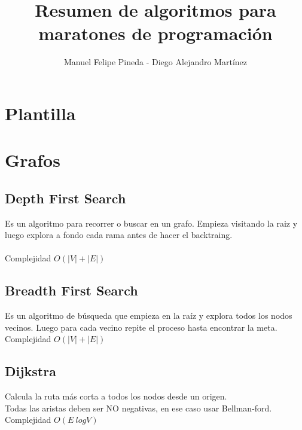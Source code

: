 \documentclass[10pt,letterpaper,twocolumn,twosided]{article}
\newcommand{\codigofuente}[1]{

\dotfill
}
\begin{document}
\title{Resumen de algoritmos para maratones de programación}
\author{Manuel Felipe Pineda - Diego Alejandro Martínez}
\maketitle

\tableofcontents
{}

\newpage

\section{Plantilla}
\codigofuente{../src/template.${EXT}}

\section{Grafos}

\subsection{Depth First Search}

Es un algoritmo para recorrer o buscar en un grafo. Empieza visitando la raiz y luego explora 
a fondo cada rama antes de hacer el backtraing.\\
\\
Complejidad $O(|V|+|E|)$

\codigofuente{../src/dfs.${EXT}}

\subsection{Breadth First Search}

Es un algoritmo de búsqueda que empieza en la raíz y explora todos los nodos vecinos. Luego para cada
vecino repite el proceso hasta encontrar la meta.\\
Complejidad $O(|V|+|E|)$

\codigofuente{../src/bfs.${EXT}}

\subsection{Dijkstra}

Calcula la ruta más corta a todos los nodos desde un origen.\\
Todas las aristas deben ser NO negativas, en ese caso usar Bellman-ford.\\
Complejidad $O(E\ log V)$
\end{document}
